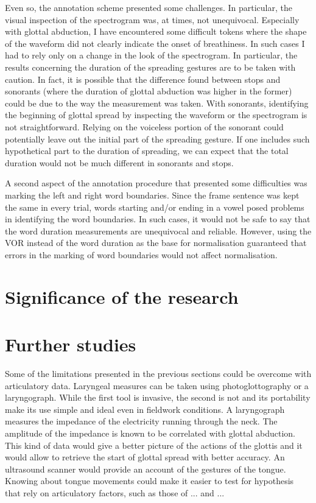 \documentclass[11pt,a4paper,openany]{memoir}\usepackage[]{graphicx}\usepackage[]{color}
\begin{document}
Even so, the annotation scheme presented some challenges.
In particular, the visual inspection of the spectrogram was, at times, not unequivocal.
Especially with glottal abduction, I have encountered some difficult tokens where the shape of the waveform did not clearly indicate the onset of breathiness.
In such cases I had to rely only on a change in the look of the spectrogram.
In particular, the results concerning the duration of the spreading gestures are to be taken with caution.
In fact, it is possible that the difference found between stops and sonorants (where the duration of glottal abduction was higher in the former) could be due to the way the measurement was taken.
With sonorants, identifying the beginning of glottal spread by inspecting the waveform or the spectrogram is not straightforward.
Relying on the voiceless portion of the sonorant could potentially leave out the initial part of the spreading gesture.
If one includes such hypothetical part to the duration of spreading, we can expect that the total duration would not be much different in sonorants and stops.

A second aspect of the annotation procedure that presented some difficulties was marking the left and right word boundaries.
Since the frame sentence was kept the same in every trial, words starting and/or ending in a vowel posed problems in identifying the word boundaries.
In such cases, it would not be safe to say that the word duration measurements are unequivocal and reliable.
However, using the VOR instead of the word duration as the base for normalisation guaranteed that errors in the marking of word boundaries would not affect normalisation.

\section{Significance of the research}

\section{Further studies}

Some of the limitations presented in the previous sections could be overcome with articulatory data.
Laryngeal measures can be taken using photoglottography or a laryngograph.
While the first tool is invasive, the second is not and its portability make its use simple and ideal even in fieldwork conditions.
A laryngograph measures the impedance of the electricity running through the neck.
The amplitude of the impedance is known to be correlated with glottal abduction.
This kind of data would give a better picture of the actions of the glottis and it would allow to retrieve the start of glottal spread with better accuracy.
An ultrasound scanner would provide an account of the gestures of the tongue.
Knowing about tongue movements could make it easier to test for hypothesis that rely on articulatory factors, such as those of ... and ...
\end{document}

